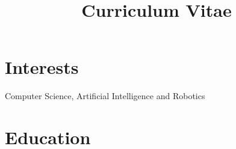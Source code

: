 \documentclass[11pt,a4paper,sans]{moderncv} %
\title{Curriculum Vitae}
\begin{document}









\makecvtitle %




 \section{Interests}
 Computer Science,
 Artificial Intelligence
 and 
 Robotics
 


\section{Education}
\end{document}
